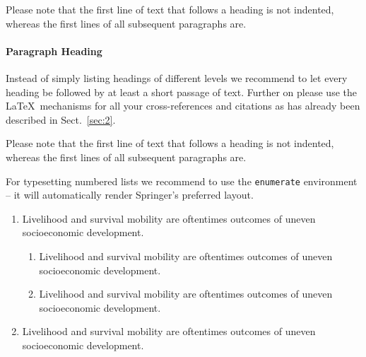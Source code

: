 \documentclass[graybox]{svmult}
\begin{document}
Please note that the first line of text that follows a heading is not indented,
whereas the first lines of all subsequent paragraphs are.


\paragraph{Paragraph Heading} %
Instead of simply listing headings of different levels we recommend to
let every heading be followed by at least a short passage of text.
Further on please use the \LaTeX\ mechanisms for all your
cross-references and citations as has already been described in
Sect.~\ref{sec:2}.

Please note that the first line of text that follows a heading is not indented, whereas the first lines of all subsequent paragraphs are.

For typesetting numbered lists we recommend to use the \verb|enumerate| environment -- it will automatically render Springer's preferred layout.

\begin{enumerate}
\item{Livelihood and survival mobility are oftentimes outcomes of uneven socioeconomic development.}
\begin{enumerate}
\item{Livelihood and survival mobility are oftentimes outcomes of uneven socioeconomic development.}
\item{Livelihood and survival mobility are oftentimes outcomes of uneven socioeconomic development.}
\end{enumerate}
\item{Livelihood and survival mobility are oftentimes outcomes of uneven socioeconomic development.}
\end{enumerate}
\end{document}
